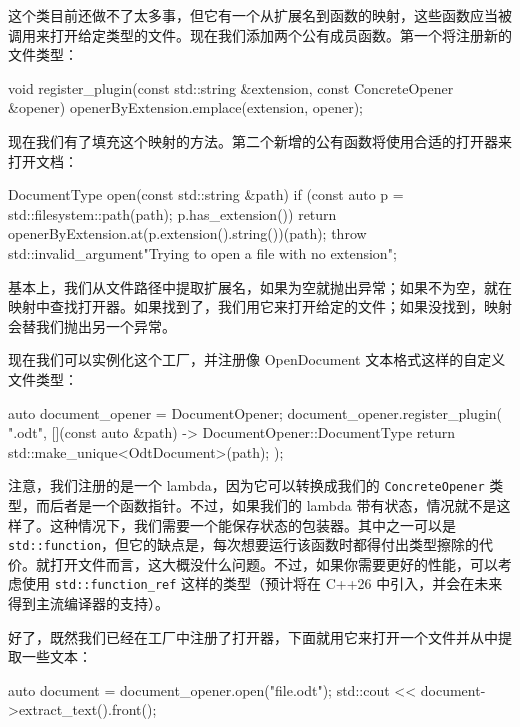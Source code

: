 这个类目前还做不了太多事，但它有一个从扩展名到函数的映射，这些函数应当被调用来打开给定类型的文件。现在我们添加两个公有成员函数。第一个将注册新的文件类型：

\begin{codebox}[cpp]
    void register_plugin(const std::string &extension, const ConcreteOpener &opener) {
        openerByExtension.emplace(extension, opener);
    }
\end{codebox}

现在我们有了填充这个映射的方法。第二个新增的公有函数将使用合适的打开器来打开文档：

\begin{codebox}[cpp]
    DocumentType open(const std::string &path) {
        if (const auto p = std::filesystem::path(path); p.has_extension()) {
            return openerByExtension.at(p.extension().string())(path);
        }
        throw std::invalid_argument{"Trying to open a file with no extension"};
    }
\end{codebox}

\label{idx:579}
基本上，我们从文件路径中提取扩展名，如果为空就抛出异常；如果不为空，就在映射中查找打开器。如果找到了，我们用它来打开给定的文件；如果没找到，映射会替我们抛出另一个异常。

现在我们可以实例化这个工厂，并注册像 OpenDocument 文本格式这样的自定义文件类型：

\begin{codebox}[cpp]
auto document_opener = DocumentOpener{};
document_opener.register_plugin(
    ".odt", [](const auto &path) -> DocumentOpener::DocumentType {
        return std::make_unique<OdtDocument>(path);
    });
\end{codebox}

\label{idx:580}
注意，我们注册的是一个 lambda，因为它可以转换成我们的 \texttt{Concrete\allowbreak{}Opener} 类型，而后者是一个函数指针。不过，如果我们的 lambda 带有状态，情况就不是这样了。这种情况下，我们需要一个能保存状态的包装器。其中之一可以是 \texttt{std::\allowbreak{}function}，但它的缺点是，每次想要运行该函数时都得付出类型擦除的代价。就打开文件而言，这大概没什么问题。不过，如果你需要更好的性能，可以考虑使用 \texttt{std::\allowbreak{}function\_\allowbreak{}ref} 这样的类型（预计将在 C++26 中引入，并会在未来得到主流编译器的支持）。

好了，既然我们已经在工厂中注册了打开器，下面就用它来打开一个文件并从中提取一些文本：

\begin{codebox}[cpp]
auto document = document_opener.open("file.odt");
std::cout << document->extract_text().front();
\end{codebox}

